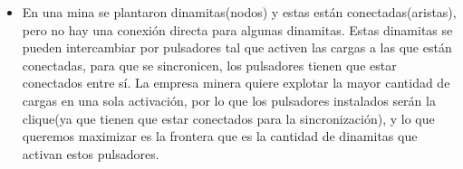 \begin{itemize}
\item En una mina se plantaron dinamitas(nodos) y estas están conectadas(aristas), pero no hay una conexión directa para algunas dinamitas. Estas dinamitas se pueden intercambiar por pulsadores tal que activen las cargas a las que están conectadas, para que se sincronicen, los pulsadores tienen que estar conectados entre sí. La empresa minera quiere explotar la mayor cantidad de cargas en una sola activación, por lo que los pulsadores instalados serán la clique(ya que tienen que estar conectados para la sincronización), y lo que queremos maximizar es la frontera que es la cantidad de dinamitas que activan estos pulsadores.

\end{itemize}


